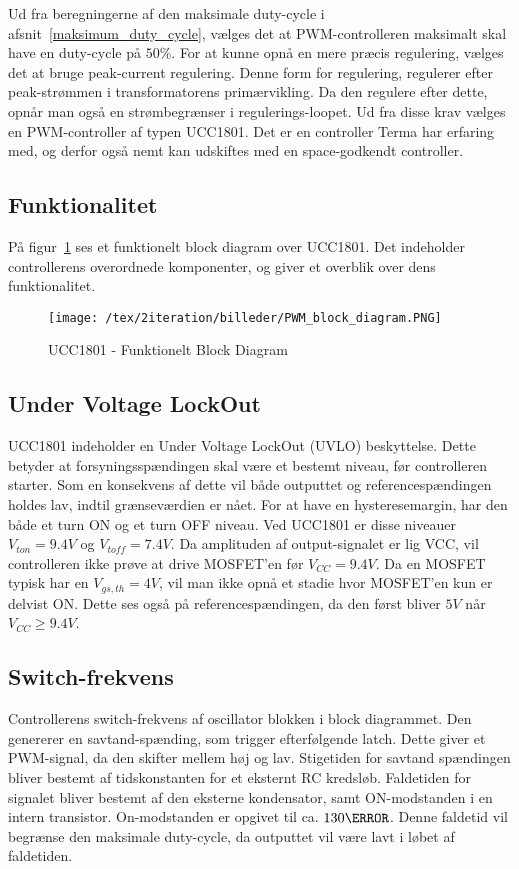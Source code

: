 Ud fra beregningerne af den maksimale duty-cycle i afsnit~\ref{maksimum_duty_cycle}, vælges det at PWM-controlleren maksimalt skal have en duty-cycle på $50\percent$. For at kunne opnå en mere præcis regulering, vælges det at bruge peak-current regulering. Denne form for regulering, regulerer efter peak-strømmen i transformatorens primærvikling. Da den regulere efter dette, opnår man også en strømbegrænser i regulerings-loopet. Ud fra disse krav vælges en PWM-controller af typen UCC1801\cite{UCC1801}. Det er en controller Terma har erfaring med, og derfor også nemt kan udskiftes med en space-godkendt controller.

\subsection{Funktionalitet}
På figur~\ref{fig:PWM_block_diagram} ses et funktionelt block diagram over UCC1801. Det indeholder controllerens overordnede komponenter, og giver et overblik over dens funktionalitet. 

\begin{figure}[H]
	\center
	\texttt{[image: /tex/2iteration/billeder/PWM\_block\_diagram.PNG]}
	\caption{UCC1801 - Funktionelt Block Diagram}
	\label{fig:PWM_block_diagram}
\end{figure}

\subsection{Under Voltage LockOut}
UCC1801 indeholder en Under Voltage LockOut (UVLO) beskyttelse. Dette betyder at forsyningsspændingen skal være et bestemt niveau, før controlleren starter. Som en konsekvens af dette vil både outputtet og referencespændingen holdes lav, indtil grænseværdien er nået. For at have en hysteresemargin, har den både et turn ON og et turn OFF niveau. Ved UCC1801 er disse niveauer $V_{ton}=9.4V$ og $V_{toff}=7.4V$. Da amplituden af output-signalet er lig VCC, vil controlleren ikke prøve at drive MOSFET'en før $V_{CC}=9.4V$. Da en MOSFET typisk har en $V_{gs,th}=4V$, vil man ikke opnå et stadie hvor MOSFET'en kun er delvist ON. Dette ses også på referencespændingen, da den først bliver $5V$ når $V_{CC}\geqslant 9.4V$.

\subsection{Switch-frekvens}
Controllerens switch-frekvens af oscillator blokken i block diagrammet. Den genererer en savtand-spænding, som trigger efterfølgende latch. Dette giver et PWM-signal, da den skifter mellem høj og lav.
Stigetiden for savtand spændingen bliver bestemt af tidskonstanten for et eksternt RC kredsløb. Faldetiden for signalet bliver bestemt af den eksterne kondensator, samt ON-modstanden i en intern transistor. On-modstanden er opgivet til ca. $130\ohm$. Denne faldetid vil begrænse den maksimale duty-cycle, da outputtet vil være lavt i løbet af faldetiden. 


